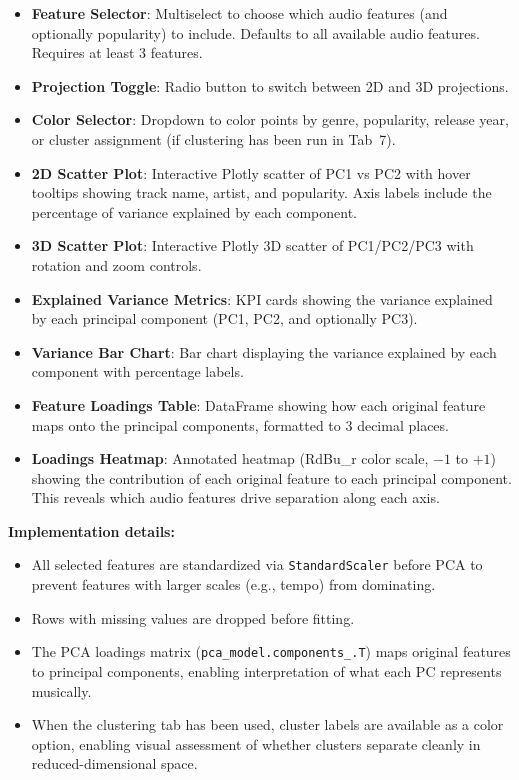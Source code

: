 \documentclass[12pt,a4paper]{article}
\begin{document}
\begin{itemize}[noitemsep]
    \item \textbf{Feature Selector}: Multiselect to choose which audio features (and optionally popularity) to include. Defaults to all available audio features. Requires at least 3 features.
    \item \textbf{Projection Toggle}: Radio button to switch between 2D and 3D projections.
    \item \textbf{Color Selector}: Dropdown to color points by genre, popularity, release year, or cluster assignment (if clustering has been run in Tab~7).
    \item \textbf{2D Scatter Plot}: Interactive Plotly scatter of PC1 vs PC2 with hover tooltips showing track name, artist, and popularity. Axis labels include the percentage of variance explained by each component.
    \item \textbf{3D Scatter Plot}: Interactive Plotly 3D scatter of PC1/PC2/PC3 with rotation and zoom controls.
    \item \textbf{Explained Variance Metrics}: KPI cards showing the variance explained by each principal component (PC1, PC2, and optionally PC3).
    \item \textbf{Variance Bar Chart}: Bar chart displaying the variance explained by each component with percentage labels.
    \item \textbf{Feature Loadings Table}: DataFrame showing how each original feature maps onto the principal components, formatted to 3 decimal places.
    \item \textbf{Loadings Heatmap}: Annotated heatmap (RdBu\_r color scale, $-1$ to $+1$) showing the contribution of each original feature to each principal component. This reveals which audio features drive separation along each axis.
\end{itemize}

\textbf{Implementation details:}
\begin{itemize}[noitemsep]
    \item All selected features are standardized via \texttt{StandardScaler} before PCA to prevent features with larger scales (e.g., tempo) from dominating.
    \item Rows with missing values are dropped before fitting.
    \item The PCA loadings matrix (\texttt{pca\_model.components\_.T}) maps original features to principal components, enabling interpretation of what each PC represents musically.
    \item When the clustering tab has been used, cluster labels are available as a color option, enabling visual assessment of whether clusters separate cleanly in reduced-dimensional space.
\end{itemize}
\end{document}
